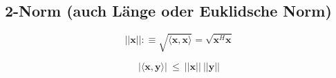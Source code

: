 	\subsection{2-Norm (auch Länge oder Euklidsche Norm)}
	
		\begin{fdef}
			\[
				||\mathbf{x}|| :\equiv \sqrt{\langle \mathbf{x},\mathbf{x} \rangle} 
					= \sqrt{\mathbf{x}^H \mathbf{x}}
			\]
		\end{fdef}
		
		\begin{ftheo}
			\[
				|\langle \mathbf{x},\mathbf{y} \rangle| \ \leq \ ||\mathbf{x}|| \ ||\mathbf{y}||
			\]
		\end{ftheo}


	
	
	

